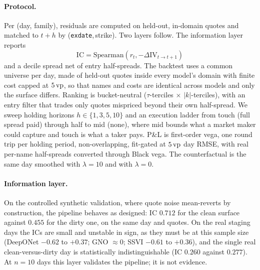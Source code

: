 \paragraph{Protocol.} Per (day, family), residuals are computed on held-out, in-domain quotes
and matched to $t+h$ by (\texttt{exdate},\,strike). Two layers follow. The information layer
reports $$\mathrm{IC}=\mathrm{Spearman}(r_t,-\Delta\mathrm{IV}_{t\to t+1})$$ and a decile spread
net of entry half-spreads. The backtest uses a common universe per day, made of held-out quotes
inside every model's domain with finite cost capped at $5\,\text{vp}$, so that names and costs are
identical across models and only the surface differs. Ranking is bucket-neutral
($\tau$-terciles $\times$ $|k|$-terciles), with an entry filter that trades only quotes
mispriced beyond their own half-spread. We sweep holding horizons $h\in\{1,3,5,10\}$ and an
execution ladder from touch (full spread paid) through half to mid (none), where mid bounds
what a market maker could capture and touch is what a taker pays. P\&L is first-order vega, one
round trip per holding period, non-overlapping, fit-gated at $5\,\text{vp}$ day RMSE, with real
per-name half-spreads converted through Black vega. The counterfactual is the same day smoothed
with $\lambda=10$ and with $\lambda=0$.

\paragraph{Information layer.} On the controlled synthetic validation, where quote noise
mean-reverts by construction, the pipeline behaves as designed: IC $0.712$ for the clean
surface against $0.455$ for the dirty one, on the same day and quotes. On the real staging days
the ICs are small and unstable in sign, as they must be at this sample size (DeepONet $-0.62$
to $+0.37$; GNO $\approx0$; SSVI $-0.61$ to $+0.36$), and the single real clean-versus-dirty day
is statistically indistinguishable (IC $0.260$ against $0.277$). At $n=10$ days this layer
validates the pipeline; it is not evidence.

